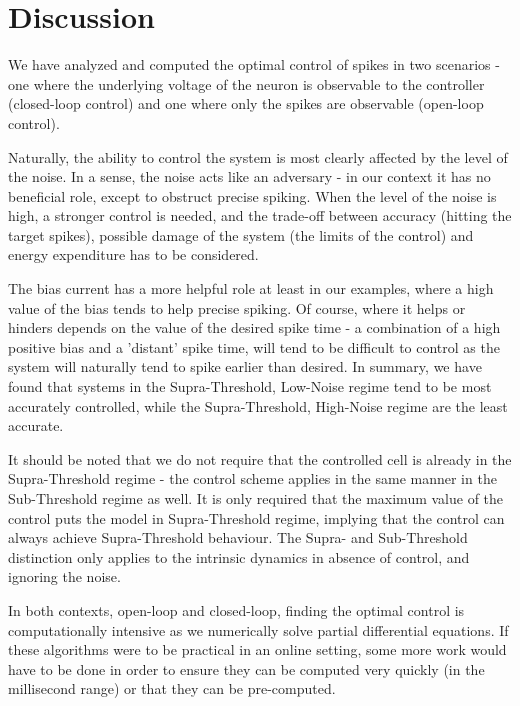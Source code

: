\section{Discussion}
We have analyzed and computed the optimal control of spikes in two scenarios -
one where the underlying voltage of the neuron is observable to the controller
(closed-loop control) and one where only the spikes are observable (open-loop
control).

Naturally, the ability to control the system is most clearly affected by the
level of the noise. In a sense, the noise acts like an adversary - in our
context it has no beneficial role, except to obstruct precise spiking.
When the level of the noise is high, a stronger control is needed, and
the trade-off between accuracy (hitting the target spikes), possible
damage of the system (the limits of the control) and energy expenditure
has to be considered.

The bias current has a more helpful role at least in our examples, where a
high value of the bias tends to help precise spiking. Of course, where it helps
or hinders depends on the value of the desired spike time - a combination of a
high positive bias and a 'distant' spike time, will tend to be difficult to
control as the system will naturally tend to spike earlier than desired.
In summary, we have found that systems in the Supra-Threshold, Low-Noise regime
tend to be most accurately controlled, while the Supra-Threshold, High-Noise
regime are the least accurate. 

It should be noted that we do not require that the controlled
cell is already in the Supra-Threshold regime - the control scheme
applies in the same manner in the Sub-Threshold regime as well. It is
only required that the maximum value of the control puts the 
model in Supra-Threshold regime, implying that the control can 
always achieve Supra-Threshold behaviour. The Supra- and Sub-Threshold
distinction only applies to the intrinsic dynamics in
absence of control, and ignoring the noise.

In both contexts, open-loop and closed-loop, finding the optimal control is
computationally intensive as we numerically solve partial differential
equations. If these algorithms were to be practical in an online setting, some
more work would have to be done in order to ensure they can be computed very
quickly (in the millisecond range) or that they can be pre-computed.

